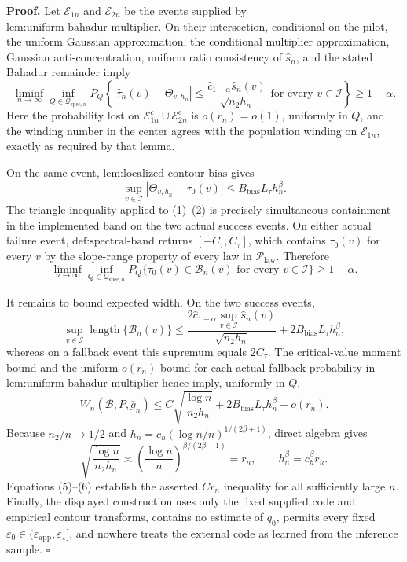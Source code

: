 \textbf{Proof.}
Let \(\mathcal E_{1n}\) and \(\mathcal E_{2n}\) be the events supplied by \(\text{lem:uniform-bahadur-multiplier}\).  On their intersection, conditional on the pilot, the uniform Gaussian approximation, the conditional multiplier approximation, Gaussian anti-concentration, uniform ratio consistency of \(\widehat s_n\), and the stated Bahadur remainder imply
\[
 \liminf_{n\to\infty}\inf_{Q\in\mathcal Q_{\mathrm{spec},n}}
 P_Q\left\{
 |\widehat\tau_n(v)-\Theta_{v,h_n}|
 \le \frac{\widehat c_{1-\alpha}\widehat s_n(v)}{\sqrt{n_2h_n}}
 \text{ for every }v\in\mathcal I
 \right\}\ge 1-\alpha. \tag{1}
\]
Here the probability lost on \(\mathcal E_{1n}^c\cup\mathcal E_{2n}^c\) is \(o(r_n)=o(1)\), uniformly in \(Q\), and the winding number in the center agrees with the population winding on \(\mathcal E_{1n}\), exactly as required by that lemma.

On the same event, \(\text{lem:localized-contour-bias}\) gives
\[
 \sup_{v\in\mathcal I}|\Theta_{v,h_n}-\tau_0(v)|
 \le B_{\mathrm{bias}}L_\tau h_n^\beta. \tag{2}
\]
The triangle inequality applied to (1)--(2) is precisely simultaneous containment in the implemented band on the two actual success events.  On either actual failure event, \(\text{def:spectral-band}\) returns \([-C_\tau,C_\tau]\), which contains \(\tau_0(v)\) for every \(v\) by the slope-range property of every law in \(\mathcal P_{\mathrm{law}}\).  Therefore
\[
 \liminf_{n\to\infty}\inf_{Q\in\mathcal Q_{\mathrm{spec},n}}
 P_Q\{\tau_0(v)\in\mathcal B_n(v)\text{ for every }v\in\mathcal I\}
 \ge 1-\alpha. \tag{3}
\]

It remains to bound expected width.  On the two success events,
\[
 \sup_{v\in\mathcal I}\operatorname{length}\{\mathcal B_n(v)\}
 \le
 \frac{2\widehat c_{1-\alpha}\sup_{v\in\mathcal I}\widehat s_n(v)}{\sqrt{n_2h_n}}
 +2B_{\mathrm{bias}}L_\tau h_n^\beta, \tag{4}
\]
whereas on a fallback event this supremum equals \(2C_\tau\).  The critical-value moment bound and the uniform \(o(r_n)\) bound for each actual fallback probability in \(\text{lem:uniform-bahadur-multiplier}\) hence imply, uniformly in \(Q\),
\[
 W_n(\mathcal B,P,\bar g_n)
 \le C\sqrt{\frac{\log n}{n_2h_n}}
 +2B_{\mathrm{bias}}L_\tau h_n^\beta+o(r_n). \tag{5}
\]
Because \(n_2/n\to1/2\) and \(h_n=c_h(\log n/n)^{1/(2\beta+1)}\), direct algebra gives
\[
 \sqrt{\frac{\log n}{n_2h_n}}\asymp
 \left(\frac{\log n}{n}\right)^{\beta/(2\beta+1)}=r_n,
 \qquad
 h_n^\beta=c_h^\beta r_n. \tag{6}
\]
Equations (5)--(6) establish the asserted \(Cr_n\) inequality for all sufficiently large \(n\).  Finally, the displayed construction uses only the fixed supplied code and empirical contour transforms, contains no estimate of \(q_0\), permits every fixed \(\varepsilon_0\in(\varepsilon_{\mathrm{app}},\varepsilon_\star]\), and nowhere treats the external code as learned from the inference sample. \(\square\)
